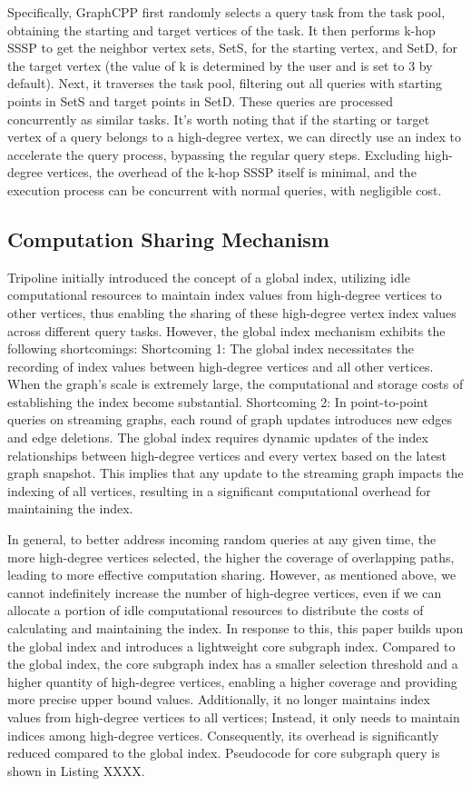 \documentclass[lettersize,journal]{IEEEtran} %
\begin{document}
Specifically, GraphCPP first randomly selects a query task from the task pool, obtaining the starting and target vertices of the task. It then performs k-hop SSSP to get the neighbor vertex sets, SetS, for the starting vertex, and SetD, for the target vertex (the value of k is determined by the user and is set to 3 by default). Next, it traverses the task pool, filtering out all queries with starting points in SetS and target points in SetD. These queries are processed concurrently as similar tasks. It's worth noting that if the starting or target vertex of a query belongs to a high-degree vertex, we can directly use an index to accelerate the query process, bypassing the regular query steps. Excluding high-degree vertices, the overhead of the k-hop SSSP itself is minimal, and the execution process can be concurrent with normal queries, with negligible cost.


\subsection{Computation Sharing Mechanism}
Tripoline initially introduced the concept of a global index, utilizing idle computational resources to maintain index values from high-degree vertices to other vertices, thus enabling the sharing of these high-degree vertex index values across different query tasks. However, the global index mechanism exhibits the following shortcomings:  Shortcoming 1: The global index necessitates the recording of index values between high-degree vertices and all other vertices. When the graph's scale is extremely large, the computational and storage costs of establishing the index become substantial. Shortcoming 2: In point-to-point queries on streaming graphs, each round of graph updates introduces new edges and edge deletions. The global index requires dynamic updates of the index relationships between high-degree vertices and every vertex based on the latest graph snapshot. This implies that any update to the streaming graph impacts the indexing of all vertices, resulting in a significant computational overhead for maintaining the index.

In general, to better address incoming random queries at any given time, the more high-degree vertices selected, the higher the coverage of overlapping paths, leading to more effective computation sharing. However, as mentioned above, we cannot indefinitely increase the number of high-degree vertices, even if we can allocate a portion of idle computational resources to distribute the costs of calculating and maintaining the index. In response to this, this paper builds upon the global index and introduces a lightweight core subgraph index. Compared to the global index, the core subgraph index has a smaller selection threshold and a higher quantity of high-degree vertices, enabling a higher coverage and providing more precise upper bound values. Additionally, it no longer maintains index values from high-degree vertices to all vertices; Instead, it only needs to maintain indices among high-degree vertices. Consequently, its overhead is significantly reduced compared to the global index. Pseudocode for core subgraph query is shown in Listing XXXX.
\end{document}
